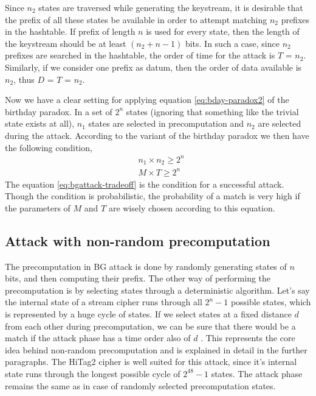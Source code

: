 Since $n_2$ states are traversed while generating the keystream, it is desirable that the prefix of all these states be available in order to attempt matching $n_2$ prefixes in the hashtable. If prefix of length $n$ is used for every state, then the length of the keystream should be at least $(n_2 + n - 1)$ bits. In such a case, since $n_2$ prefixes are searched in the hashtable, the order of time for the attack is $T$ = $n_2$. Similarly, if we consider one prefix as datum, then the order of data available is $n_2$, thus $D$ = $T$ = $n_2$.

Now we have a clear setting for applying equation \ref{eq:bday-paradox2} of the birthday paradox. In a set of $2^n$ states (ignoring that something like the trivial state exists at all), $n_1$ states are selected in precomputation and $n_2$ are selected during the attack. According to the variant of the birthday paradox we then have the following condition,
\begin{align}
& n_1 \times n_2 \geq 2^n\\
\label{eq:bgattack-tradeoff} & M \times T \geq 2^n
\end{align}
The equation \ref{eq:bgattack-tradeoff} is the condition for a successful attack. Though the condition is probabilistic, the probability of a match is very high if the parameters of $M$ and $T$ are wisely chosen according to this equation.

\subsection{Attack with non-random precomputation}
\label{sec:bg-nr}

The precomputation in BG attack is done by randomly generating states of $n$ bits, and then computing their prefix. The other way of performing the precomputation is by selecting states through a deterministic algorithm. Let's say the internal state of a stream cipher runs through all $2^n - 1$ possible states, which is represented by a huge cycle of states. If we select states at a fixed distance $d$ from each other during precomputation, we can be sure that there would be a match if the attack phase has a time order also of $d$ \cite{erik-discussions}. This represents the core idea behind non-random precomputation and is explained in detail in the further paragraphs. The HiTag2 cipher is well suited for this attack, since it's internal state runs through the longest possible cycle of $2^{48} - 1$ states. The attack phase remains the same as in case of randomly selected precomputation states.\\

